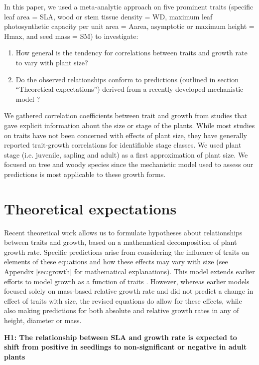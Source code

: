 \documentclass[a4paper]{article}\usepackage[]{graphicx}\usepackage[]{color}
\begin{document}
In this paper, we used a meta-analytic approach on five prominent traits (specific leaf area = SLA, wood or stem tissue density = WD, maximum leaf photosynthetic capacity per unit area = Aarea, asymptotic or maximum height = Hmax, and seed mass = SM) to investigate:
\begin{enumerate}
  \item How general is the tendency for correlations between traits and growth rate to vary with plant size?
  \item  Do the observed relationships conform to predictions (outlined in section ``Theoretical expectations'') derived from a recently developed mechanistic model \citep{Falster:2011ii}?
\end{enumerate}
We gathered correlation coefficients between trait and growth from studies that gave explicit information about the size or stage of the plants. While most studies on traits have not been concerned with effects of plant size, they have generally reported trait-growth correlations for identifiable stage classes. We used plant stage (i.e. juvenile, sapling and adult) as a first approximation of plant size. We focused on tree and woody species since the mechanistic model used to assess our predictions is most applicable to these growth forms.

\section*{Theoretical expectations}\label{theory}

Recent theoretical work \citep{Falster:2011ii} allows us to formulate hypotheses about relationships between traits and growth, based on a mathematical decomposition of plant growth rate. Specific predictions arise from considering the influence of traits on elements of these equations and how these effects may vary with size (see Appendix \ref{sec:growth} for mathematical explanations). This model extends earlier efforts to model growth as a function of traits \citep{Lambers:1992bj,cornelissen_seedling_1996,Wright:2000kw,Enquist:2007ek}. However, whereas earlier models focused solely on mass-based relative growth rate and did not predict a change in effect of traits with size, the revised equations do allow for these effects, while also making predictions for both absolute and relative growth rates in any of height, diameter or mass.

\textbf{H1: The relationship between SLA and growth rate is expected to shift from positive in seedlings to non-significant or negative in adult plants}
\end{document}
